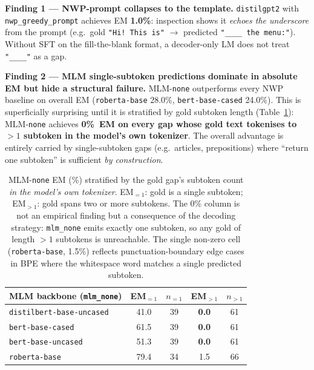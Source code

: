 \documentclass[11pt]{article}
\begin{document}
\textbf{Finding 1 — NWP-prompt collapses to the template.}
\texttt{distilgpt2} with \texttt{nwp\_greedy\_prompt} achieves EM
\textbf{1.0\%}: inspection shows it \emph{echoes the underscore} from the
prompt (e.g.\ gold \texttt{"Hi! This is"} $\to$ predicted
\texttt{"\_\_\_\_ the menu:"}). Without SFT on the fill-the-blank format,
a decoder-only LM does not treat \texttt{"\_\_\_\_"} as a gap.

\textbf{Finding 2 — MLM single-subtoken predictions dominate in absolute
EM but hide a structural failure.}
MLM-\texttt{none} outperforms every NWP baseline on overall EM
(\texttt{roberta-base} 28.0\%, \texttt{bert-base-cased} 24.0\%). This is
superficially surprising until it is stratified by gold subtoken length
(Table~\ref{tab:mlm-none-subtok}): MLM-\texttt{none} achieves
\textbf{0\%~EM on every gap whose gold text tokenises to $>1$ subtoken in
the model's own tokenizer}. The overall advantage is entirely carried by
single-subtoken gaps (e.g.\ articles, prepositions) where ``return one
subtoken'' is sufficient \emph{by construction}.

\begin{table}[t]
\centering\scriptsize
\setlength{\tabcolsep}{3pt}
\begin{tabular}{@{}lcccc@{}}
\toprule
MLM backbone (\texttt{mlm\_none}) & EM$_{=1}$ & $n_{=1}$ & EM$_{>1}$ & $n_{>1}$ \\
\midrule
\texttt{distilbert-base-uncased}  & 41.0 & 39 & \textbf{0.0} & 61 \\
\texttt{bert-base-cased}          & 61.5 & 39 & \textbf{0.0} & 61 \\
\texttt{bert-base-uncased}        & 51.3 & 39 & \textbf{0.0} & 61 \\
\texttt{roberta-base}             & 79.4 & 34 & \phantom{0}1.5 & 66 \\
\bottomrule
\end{tabular}
\caption{MLM-\texttt{none} EM (\%) stratified by the gold gap's subtoken
count \emph{in the model's own tokenizer}. EM$_{=1}$: gold is a single
subtoken; EM$_{>1}$: gold spans two or more subtokens. The 0\% column is
not an empirical finding but a consequence of the decoding strategy:
\texttt{mlm\_none} emits exactly one subtoken, so any gold of length $>1$
subtokens is unreachable. The single non-zero cell (\texttt{roberta-base},
1.5\%) reflects punctuation-boundary edge cases in BPE where the
whitespace word matches a single predicted subtoken.}
\label{tab:mlm-none-subtok}
\end{table}
\end{document}
